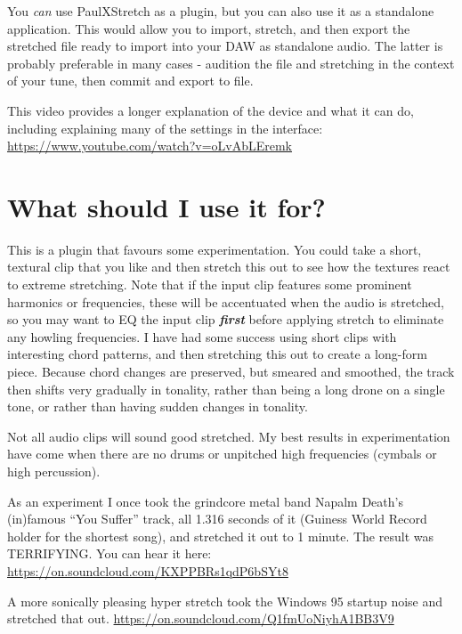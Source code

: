 \documentclass[
  12pt,
  letterpaper,
  oneside,
  open=any]{scrbook}
\makeatletter
\newcommand*\pandocbounded[1]{%
  \sbox\pandoc@box{#1}%
  \Gscale@div\@tempa{\textheight}{\dimexpr\ht\pandoc@box+\dp\pandoc@box\relax}%
  \Gscale@div\@tempb{\linewidth}{\wd\pandoc@box}%
  \ifdim\@tempb\p@<\@tempa\p@\let\@tempa\@tempb\fi%
  \ifdim\@tempa\p@<\p@\scalebox{\@tempa}{\usebox\pandoc@box}%
  \else\usebox{\pandoc@box}%
  \fi%
}
\makeatother
\begin{document}
You \emph{can} use PaulXStretch as a plugin, but you can also use it as
a standalone application. This would allow you to import, stretch, and
then export the stretched file ready to import into your DAW as
standalone audio. The latter is probably preferable in many cases -
audition the file and stretching in the context of your tune, then
commit and export to file.

\pandocbounded{\texttt{[image: images/paulxstretch\_screenshot.png]}}

This video provides a longer explanation of the device and what it can
do, including explaining many of the settings in the interface:
\url{https://www.youtube.com/watch?v=oLvAbLEremk}

\section{What should I use it for?}\label{what-should-i-use-it-for}

This is a plugin that favours some experimentation. You could take a
short, textural clip that you like and then stretch this out to see how
the textures react to extreme stretching. Note that if the input clip
features some prominent harmonics or frequencies, these will be
accentuated when the audio is stretched, so you may want to EQ the input
clip \textbf{\emph{first}} before applying stretch to eliminate any
howling frequencies. I have had some success using short clips with
interesting chord patterns, and then stretching this out to create a
long-form piece. Because chord changes are preserved, but smeared and
smoothed, the track then shifts very gradually in tonality, rather than
being a long drone on a single tone, or rather than having sudden
changes in tonality.

Not all audio clips will sound good stretched. My best results in
experimentation have come when there are no drums or unpitched high
frequencies (cymbals or high percussion).

As an experiment I once took the grindcore metal band Napalm Death's
(in)famous ``You Suffer'' track, all 1.316 seconds of it (Guiness World
Record holder for the shortest song), and stretched it out to 1 minute.
The result was TERRIFYING. You can hear it here:
\url{https://on.soundcloud.com/KXPPBRs1qdP6bSYt8}

A more sonically pleasing hyper stretch took the Windows 95 startup
noise and stretched that out.
\url{https://on.soundcloud.com/Q1fmUoNiyhA1BB3V9}
\end{document}
